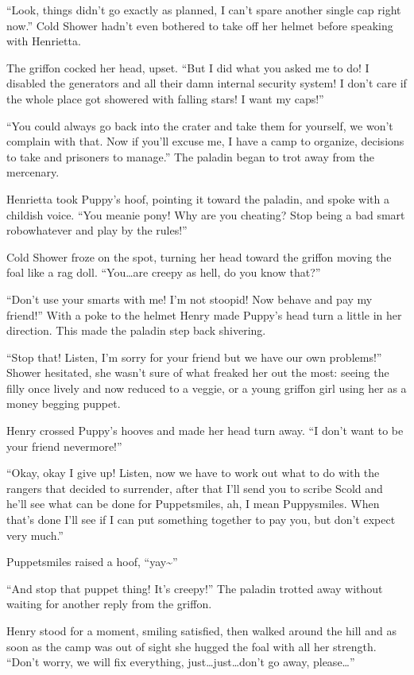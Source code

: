 ``Look, things didn't go exactly as planned, I can't spare another single cap right now.'' Cold Shower hadn't even bothered to take off her helmet before speaking with Henrietta.

The griffon cocked her head, upset. ``But I did what you asked me to do! I disabled the generators and all their damn internal security system! I don't care if the whole place got showered with falling stars! I want my caps!''

``You could always go back into the crater and take them for yourself, we won't complain with that. Now if you'll excuse me, I have a camp to organize, decisions to take and prisoners to manage.'' The paladin began to trot away from the mercenary.

Henrietta took Puppy's hoof, pointing it toward the paladin, and spoke with a childish voice. ``You meanie pony! Why are you cheating? Stop being a bad smart robowhatever and play by the rules!''

Cold Shower froze on the spot, turning her head toward the griffon moving the foal like a rag doll. ``You\dots are creepy as hell, do you know that?''

``Don't use your smarts with me! I'm not stoopid! Now behave and pay my friend!'' With a poke to the helmet Henry made Puppy's head turn a little in her direction. This made the paladin step back shivering.

``Stop that! Listen, I'm sorry for your friend but we have our own problems!'' Shower hesitated, she wasn't sure of what freaked her out the most: seeing the filly once lively and now reduced to a veggie, or a young griffon girl using her as a money begging puppet.

Henry crossed Puppy's hooves and made her head turn away. ``I don't want to be your friend nevermore!''

``Okay, okay I give up! Listen, now we have to work out what to do with the rangers that decided to surrender, after that I'll send you to scribe Scold and he'll see what can be done for Puppetsmiles, ah, I mean Puppysmiles. When that's done I'll see if I can put something together to pay you, but don't expect very much.''

Puppetsmiles raised a hoof, ``yay\textasciitilde''

``And stop that puppet thing! It's creepy!'' The paladin trotted away without waiting for another reply from the griffon.

Henry stood for a moment, smiling satisfied, then walked around the hill and as soon as the camp was out of sight she hugged the foal with all her strength. ``Don't worry, we will fix everything, just\dots just\dots don't go away, please\dots''

